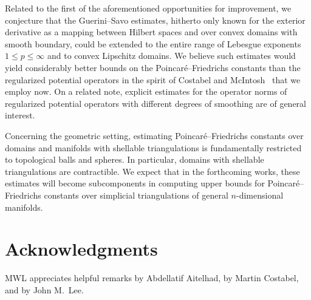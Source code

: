 \documentclass[10pt,a4paper]{article}
\begin{document}
Related to the first of the aforementioned opportunities for improvement, we conjecture that the Guerini--Savo estimates, hitherto only known for the exterior derivative as a mapping between Hilbert spaces and over convex domains with smooth boundary, could be extended to the entire range of Lebesgue exponents $1 \leq p \leq \infty$ and to convex Lipschitz domains. We believe such estimates would yield considerably better bounds on the Poincar\'e--Friedrichs constants than the regularized potential operators in the spirit of Costabel and McIntosh~\cite{costabel2010bogovskiui} that we employ now. 
On a related note, explicit estimates for the operator norms of regularized potential operators with different degrees of smoothing are of general interest. 

Concerning the geometric setting, estimating Poincar\'e--Friedrichs constants over domains and manifolds with shellable triangulations is fundamentally restricted to topological balls and spheres. In particular, domains with shellable triangulations are contractible. We expect that in the forthcoming works, these estimates will become subcomponents in computing upper bounds for Poincar\'e--Friedrichs constants over simplicial triangulations of general $n$-dimensional manifolds. 




\section*{Acknowledgments}

MWL appreciates helpful remarks by Abdellatif Aitelhad, by Martin Costabel, and by John M.\ Lee.



\end{document}
